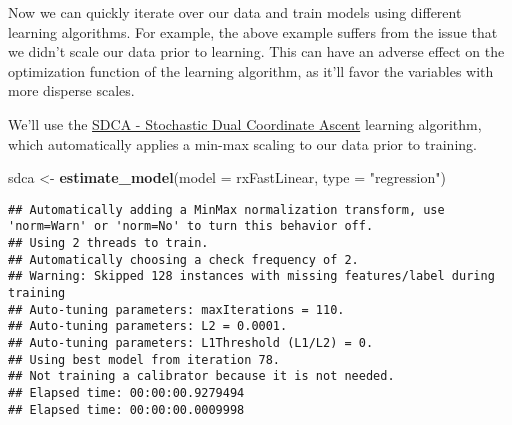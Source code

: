 \documentclass[]{book}
\newenvironment{Shaded}{\begin{snugshade}}{\end{snugshade}}
\newcommand{\KeywordTok}[1]{\textcolor[rgb]{0.13,0.29,0.53}{\textbf{#1}}}
\newcommand{\DataTypeTok}[1]{\textcolor[rgb]{0.13,0.29,0.53}{#1}}
\newcommand{\StringTok}[1]{\textcolor[rgb]{0.31,0.60,0.02}{#1}}
\newcommand{\ControlFlowTok}[1]{\textcolor[rgb]{0.13,0.29,0.53}{\textbf{#1}}}
\newcommand{\OperatorTok}[1]{\textcolor[rgb]{0.81,0.36,0.00}{\textbf{#1}}}
\newcommand{\NormalTok}[1]{#1}
\theoremstyle{definition}
\theoremstyle{definition}
\theoremstyle{definition}
\theoremstyle{remark}
\begin{document}
\begin{Shaded}
\end{Shaded}

Now we can quickly iterate over our data and train models using
different learning algorithms. For example, the above example suffers
from the issue that we didn't scale our data prior to learning. This can
have an adverse effect on the optimization function of the learning
algorithm, as it'll favor the variables with more disperse scales.

We'll use the \href{http://dl.acm.org/citation.cfm?id=2783412}{SDCA -
Stochastic Dual Coordinate Ascent} learning algorithm, which
automatically applies a min-max scaling to our data prior to training.

\begin{Shaded}
\begin{Highlighting}[]
\NormalTok{sdca <-}\StringTok{ }\KeywordTok{estimate_model}\NormalTok{(}\DataTypeTok{model =}\NormalTok{ rxFastLinear, }\DataTypeTok{type =} \StringTok{"regression"}\NormalTok{)}
\end{Highlighting}
\end{Shaded}

\begin{verbatim}
## Automatically adding a MinMax normalization transform, use 'norm=Warn' or 'norm=No' to turn this behavior off.
## Using 2 threads to train.
## Automatically choosing a check frequency of 2.
## Warning: Skipped 128 instances with missing features/label during training
## Auto-tuning parameters: maxIterations = 110.
## Auto-tuning parameters: L2 = 0.0001.
## Auto-tuning parameters: L1Threshold (L1/L2) = 0.
## Using best model from iteration 78.
## Not training a calibrator because it is not needed.
## Elapsed time: 00:00:00.9279494
## Elapsed time: 00:00:00.0009998
\end{verbatim}
\end{document}
